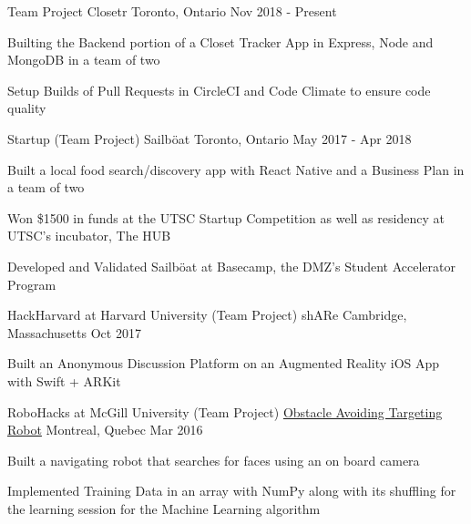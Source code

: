 \begin{cventries}
\cventry
    {Team Project}
    {Closetr}
    {Toronto, Ontario}
    {Nov 2018 - Present}
    {
      \begin{cvitems}
        \item {Builting the Backend portion of a Closet Tracker App in Express, Node and MongoDB in a team of two}
        \item{Setup Builds of Pull Requests in CircleCI and Code Climate to ensure code quality}
      \end{cvitems}
    }
\cventry
  {Startup (Team Project)}
  {Sailböat}
  {Toronto, Ontario}
  {May 2017 - Apr 2018}
  {
    \begin{cvitems}
      \item {Built a local food search/discovery app with React Native and a Business Plan in a team of two}
      \item {Won \$1500 in funds at the UTSC Startup Competition as well as residency at UTSC's incubator, The HUB}
      \item {Developed and Validated Sailböat at Basecamp, the DMZ's Student Accelerator Program}
    \end{cvitems}
  }
\cventry
  {HackHarvard at Harvard University (Team Project)}
  {shARe}
  {Cambridge, Massachusetts}
  {Oct 2017}
  {
    \begin{cvitems}
      \item {Built an Anonymous Discussion Platform on an Augmented Reality iOS App with Swift + ARKit}
    \end{cvitems}
  }
\cventry
  {RoboHacks at McGill University (Team Project)}
  {\href{https://github.com/PhABC/HeadHunterBots}{Obstacle Avoiding Targeting Robot}}
  {Montreal, Quebec}
  {Mar 2016}
  {
    \begin{cvitems}
      \item {Built a navigating robot that searches for faces using an on board camera}
      \item {Implemented Training Data in an array with NumPy along with its shuffling for the learning session for the Machine Learning algorithm}
    \end{cvitems}
  }
\end{cventries}
